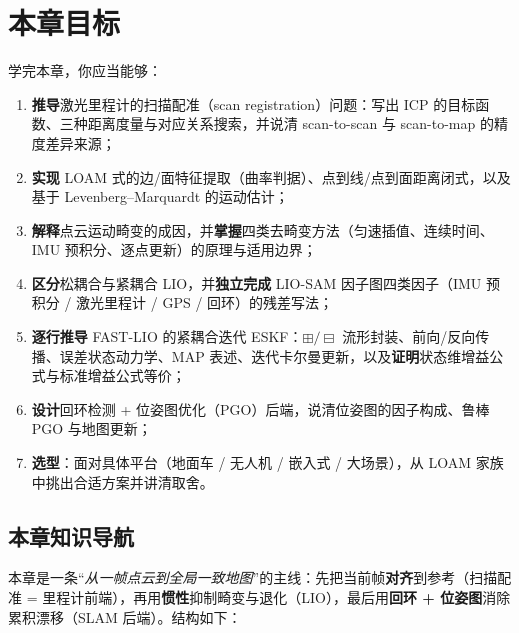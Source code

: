 \section*{本章目标}
学完本章，你应当能够：
\begin{enumerate}
  \item \textbf{推导}激光里程计的扫描配准（scan registration）问题：写出 ICP 的目标函数、三种距离度量与对应关系搜索，并说清 scan-to-scan 与 scan-to-map 的精度差异来源；
  \item \textbf{实现} LOAM 式的边/面特征提取（曲率判据）、点到线/点到面距离闭式，以及基于 Levenberg–Marquardt 的运动估计；
  \item \textbf{解释}点云运动畸变的成因，并\textbf{掌握}四类去畸变方法（匀速插值、连续时间、IMU 预积分、逐点更新）的原理与适用边界；
  \item \textbf{区分}松耦合与紧耦合 LIO，并\textbf{独立完成} LIO-SAM 因子图四类因子（IMU 预积分 / 激光里程计 / GPS / 回环）的残差写法；
  \item \textbf{逐行推导} FAST-LIO 的紧耦合迭代 ESKF：$\boxplus/\boxminus$ 流形封装、前向/反向传播、误差状态动力学、MAP 表述、迭代卡尔曼更新，以及\textbf{证明}状态维增益公式与标准增益公式等价；
  \item \textbf{设计}回环检测 + 位姿图优化（PGO）后端，说清位姿图的因子构成、鲁棒 PGO 与地图更新；
  \item \textbf{选型}：面对具体平台（地面车 / 无人机 / 嵌入式 / 大场景），从 LOAM 家族中挑出合适方案并讲清取舍。
\end{enumerate}

\subsection*{本章知识导航}
本章是一条“\emph{从一帧点云到全局一致地图}”的主线：先把当前帧\textbf{对齐}到参考（扫描配准 = 里程计前端），再用\textbf{惯性}抑制畸变与退化（LIO），最后用\textbf{回环 + 位姿图}消除累积漂移（SLAM 后端）。结构如下：

